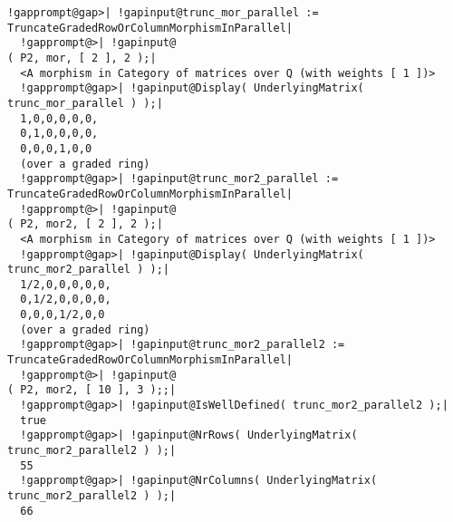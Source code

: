 \documentclass[a4paper,11pt]{report}
\begin{document}
{{{\begin{Verbatim}[commandchars=!@|,fontsize=\small,frame=single,label=Example]
  !gapprompt@gap>| !gapinput@trunc_mor_parallel := TruncateGradedRowOrColumnMorphismInParallel|
  !gapprompt@>| !gapinput@                                              ( P2, mor, [ 2 ], 2 );|
  <A morphism in Category of matrices over Q (with weights [ 1 ])>
  !gapprompt@gap>| !gapinput@Display( UnderlyingMatrix( trunc_mor_parallel ) );|
  1,0,0,0,0,0,
  0,1,0,0,0,0,
  0,0,0,1,0,0
  (over a graded ring)
  !gapprompt@gap>| !gapinput@trunc_mor2_parallel := TruncateGradedRowOrColumnMorphismInParallel|
  !gapprompt@>| !gapinput@                                              ( P2, mor2, [ 2 ], 2 );|
  <A morphism in Category of matrices over Q (with weights [ 1 ])>
  !gapprompt@gap>| !gapinput@Display( UnderlyingMatrix( trunc_mor2_parallel ) );|
  1/2,0,0,0,0,0,
  0,1/2,0,0,0,0,
  0,0,0,1/2,0,0
  (over a graded ring)
  !gapprompt@gap>| !gapinput@trunc_mor2_parallel2 := TruncateGradedRowOrColumnMorphismInParallel|
  !gapprompt@>| !gapinput@                                              ( P2, mor2, [ 10 ], 3 );;|
  !gapprompt@gap>| !gapinput@IsWellDefined( trunc_mor2_parallel2 );|
  true
  !gapprompt@gap>| !gapinput@NrRows( UnderlyingMatrix( trunc_mor2_parallel2 ) );|
  55
  !gapprompt@gap>| !gapinput@NrColumns( UnderlyingMatrix( trunc_mor2_parallel2 ) );|
  66
\end{Verbatim}
 }

 }

 }

   
\end{document}
